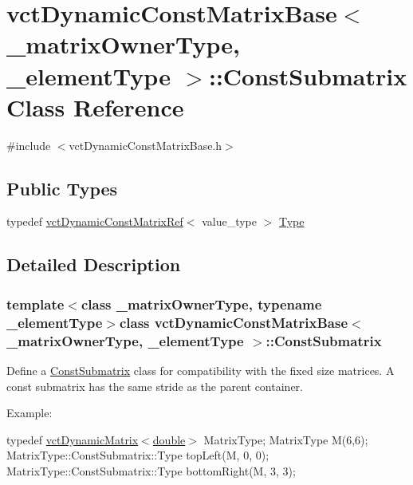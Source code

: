 \hypertarget{classvct_dynamic_const_matrix_base_1_1_const_submatrix}{}\section{vct\+Dynamic\+Const\+Matrix\+Base$<$ \+\_\+matrix\+Owner\+Type, \+\_\+element\+Type $>$\+:\+:Const\+Submatrix Class Reference}
\label{classvct_dynamic_const_matrix_base_1_1_const_submatrix}


{\ttfamily \#include $<$vct\+Dynamic\+Const\+Matrix\+Base.\+h$>$}

\subsection*{Public Types}
\begin{DoxyCompactItemize}
\item 
typedef \hyperlink{classvct_dynamic_const_matrix_ref}{vct\+Dynamic\+Const\+Matrix\+Ref}$<$ value\+\_\+type $>$ \hyperlink{classvct_dynamic_const_matrix_base_1_1_const_submatrix_afbad836196476a7943c76d9a4fc69e28}{Type}
\end{DoxyCompactItemize}


\subsection{Detailed Description}
\subsubsection*{template$<$class \+\_\+matrix\+Owner\+Type, typename \+\_\+element\+Type$>$class vct\+Dynamic\+Const\+Matrix\+Base$<$ \+\_\+matrix\+Owner\+Type, \+\_\+element\+Type $>$\+::\+Const\+Submatrix}

Define a \hyperlink{classvct_dynamic_const_matrix_base_1_1_const_submatrix}{Const\+Submatrix} class for compatibility with the fixed size matrices. A const submatrix has the same stride as the parent container.

Example\+:

typedef \hyperlink{classvct_dynamic_matrix}{vct\+Dynamic\+Matrix$<$double$>$} Matrix\+Type; Matrix\+Type M(6,6); Matrix\+Type\+::\+Const\+Submatrix\+::\+Type top\+Left(\+M, 0, 0); Matrix\+Type\+::\+Const\+Submatrix\+::\+Type bottom\+Right(\+M, 3, 3);

